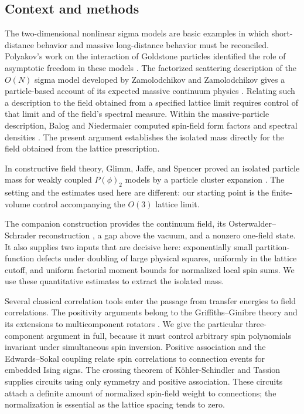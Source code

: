 \subsection{Context and methods}

The two-dimensional nonlinear sigma models are basic examples in which
short-distance behavior and massive long-distance behavior must be
reconciled. Polyakov's work on the interaction of Goldstone particles
identified the role of asymptotic freedom in these models
\cite{Polyakov1975}. The factorized scattering description of the
$O(N)$ sigma model developed by Zamolodchikov and Zamolodchikov gives
a particle-based account of its expected massive continuum physics
\cite{Zamolodchikov1979}. Relating such a description to the field
obtained from a specified lattice limit requires control of that limit
and of the field's spectral measure. Within the massive-particle
description, Balog and Niedermaier computed spin-field form factors and
spectral densities \cite{BalogNiedermaier1997}. The present argument
establishes the isolated mass directly for the field obtained from the
lattice prescription.

In constructive field theory, Glimm, Jaffe, and Spencer proved an
isolated particle mass for weakly coupled $P(\phi)_2$ models by a
particle cluster expansion \cite{GlimmJaffeSpencer1974}. The setting
and the estimates used here are different: our starting point is the
finite-volume control accompanying the $O(3)$ lattice limit.

The companion construction \cite{OpenAI-O3} provides the continuum
field, its Osterwalder--Schrader reconstruction
\cite{OsterwalderSchrader1973,OsterwalderSchrader1975}, a gap above the
vacuum, and a nonzero one-field state. It also supplies two inputs that
are decisive here: exponentially small partition-function defects under
doubling of large physical squares, uniformly in the lattice cutoff,
and uniform factorial moment bounds for normalized local spin sums.
We use these quantitative estimates to extract the isolated mass.

Several classical correlation tools enter the passage from transfer
energies to field correlations. The positivity arguments belong to the
Griffiths--Ginibre theory and its extensions to multicomponent rotators
\cite{Ginibre1970,Dunlop1976}. We give the particular three-component
argument in full, because it must control arbitrary spin polynomials
invariant under simultaneous spin inversion. Positive association
\cite{FKG1971} and the
Edwards--Sokal coupling \cite{EdwardsSokal1988} relate spin correlations
to connection events for embedded Ising signs.
The crossing theorem of K\"ohler-Schindler and Tassion
\cite{KohlerSchindlerTassion2023} supplies circuits using only symmetry
and positive association. These circuits attach a definite amount of
normalized spin-field weight to connections; the normalization is
essential as the lattice spacing tends to zero.

